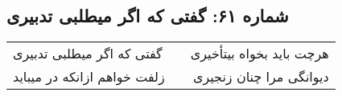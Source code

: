 \begin{center}
\section*{شماره ۶۱: گفتی که اگر میطلبی تدبیری}
\label{sec:061}
\begin{longtable}{l p{0.5cm} r}
گفتی که اگر میطلبی تدبیری
&&
هرچت باید بخواه بیتأخیری
\\
زلفت خواهم ازانکه در میباید
&&
دیوانگی مرا چنان زنجیری
\\
\end{longtable}
\end{center}
